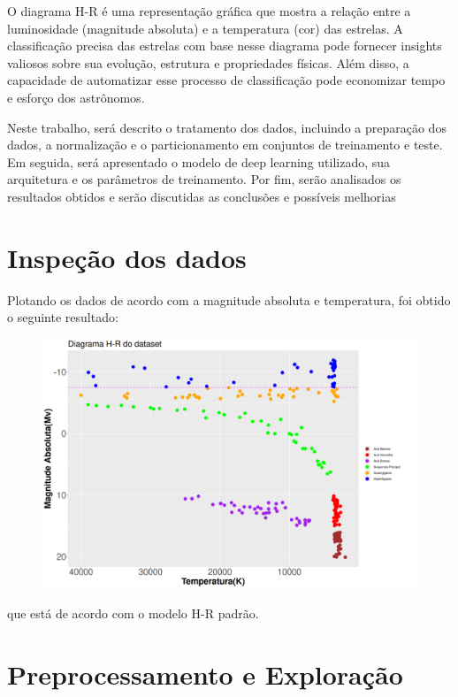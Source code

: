 \documentclass[11pt]{article}
\theoremstyle{definition}
\begin{document}
O diagrama H-R é uma representação gráfica que mostra a relação entre a luminosidade (magnitude absoluta) e a temperatura (cor) das estrelas. A classificação precisa das estrelas com base nesse diagrama pode fornecer insights valiosos sobre sua evolução, estrutura e propriedades físicas. Além disso, a capacidade de automatizar esse processo de classificação pode economizar tempo e esforço dos astrônomos.

Neste trabalho, será descrito o tratamento dos dados, incluindo a preparação dos dados, a normalização e o particionamento em conjuntos de treinamento e teste. Em seguida, será apresentado o modelo de deep learning utilizado, sua arquitetura e os parâmetros de treinamento. Por fim, serão analisados os resultados obtidos e serão discutidas as conclusões e possíveis melhorias

\pagebreak
\section*{Inspeção dos dados}
Plotando os dados de acordo com a magnitude absoluta e temperatura, foi obtido o seguinte resultado:
\begin{figure}[htbp]
    \begin{center}
        \includegraphics[scale=0.5]{../plot_hr_full.png}
    \end{center}
\end{figure}

que está de acordo com o modelo H-R padrão.



\section{Preprocessamento e Exploração}
\end{document}
